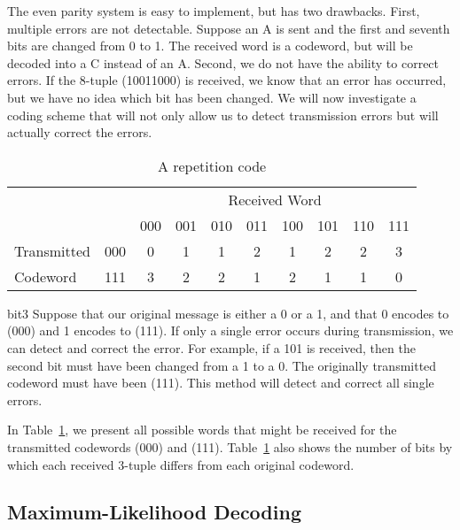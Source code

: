 The even parity system is easy to implement, but has two drawbacks.
First, multiple errors are not detectable. Suppose an A is sent and 
the first and seventh bits are changed from 0 to 1. The received word
is a codeword, but will be decoded into a C instead of an A.
Second, we do not have the ability to correct errors.  If the 8-tuple
(10011000) is received, we know that an error has occurred, but we
have no idea which bit has been changed. We will now investigate a
coding scheme that will not only allow us to detect transmission
errors but will actually correct the errors. 
 
\begin{table}[htb]
\caption{A repetition code\label{algcodes:table0}}{\small
\begin{center}
\begin{tabular}{|lc|cccccccc|}
\hline
& & \multicolumn{8}{|c|}{Received Word}    \\
            &     & 000 & 001 & 010 & 011 & 100 & 101 & 110
& 111 \\ \hline
Transmitted & 000 & 0   & 1   & 1   & 2   & 1   & 2   & 2
& 3 \\
Codeword   & 111 & 3   &  2  & 2   &  1  &  2  &   1 &  1
&  0 \\ \hline
\end{tabular}
\end{center}
}
\end{table}

\begin{example}{bit3}
Suppose that our original message is either a 0 or a 1, and that 0
encodes to (000) and 1 encodes to (111). If only a single
error occurs during transmission, we can detect and correct the
error. For example, if a 101 is received, then the second bit must
have been changed from a 1 to a 0.  The originally transmitted
codeword must have been (111). 	This method will detect and correct 
all single errors. 
 
 
In Table~\ref{algcodes:table0}, we present all possible words that might be received
for the transmitted codewords (000) and (111). Table~\ref{algcodes:table0} also shows 
the number of bits by which each received 3-tuple differs from each
original codeword. 
\end{example}

\subsection{Maximum-Likelihood Decoding\quad
{}}\label{sec:MaximumLikelihood}
 
